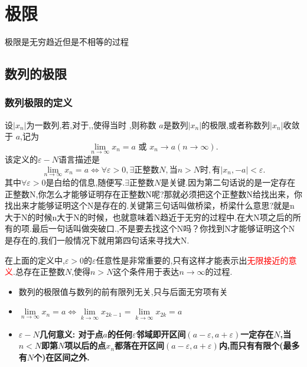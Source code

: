 \documentclass[12pt, a4paper, oneside, UTF8]{ctexbook}  %
\begin{document}
%  
\else
\fi
\chapter{极限}
极限是无穷趋近但是不相等的过程
\section{数列的极限}
\subsection{数列极限的定义}
\begin{defn}{}{}
    设$|x_n|$为一数列,若,对于,,使得当时 ,则称数 $a$是数列$| x_n |$的极限,或者称数列$| x_n |$收敛于 $a$,记为
    $$
        \lim_{n\to\infty}x_n=a\text{ 或 }x_n\to a(n\to\infty).
    $$
    该定义的$\varepsilon-N$语言描述是\\
    $$\lim_{n\to\infty}x_n=a\Leftrightarrow\forall\varepsilon>0,\exists\text{正整数}N,\text{当}n>N\text{时},\text{有}|x_n,-a|<\varepsilon.$$
    其中$\forall\varepsilon>0$是白给的信息,随便写.$\exists\text{正整数}N$是关键.因为第二句话说的是一定存在正整数N,你怎么才能够证明存在正整数N呢?那就必须把这个正整数N给找出来，你找出来才能够证明这个N是存在的.关键第三句话叫做桥梁，桥梁什么意思?就是n大于N的时候n大于N的时候，也就意味着N趋近于无穷的过程中.在大N项之后的所有的项.最后一句话叫做突破口.,不是要去找这个N吗？你找到N才能够证明这个N是存在的,我们一般情况下就用第四句话来寻找大N.
\end{defn}
在上面的定义中,$\varepsilon>0$的$\varepsilon$任意性是非常重要的,只有这样才能表示出\textcolor{red}{无限接近的意义}.总存在正整数$N$,使得$n>N$这个条件用于表达$n \to \infty$的过程.
\begin{criterion}{}{}
    \begin{itemize}
        \item 数列的极限值与数列的前有限列无关,只与后面无穷项有关
        \item $\underset{n\to\infty}{\operatorname*{\lim}}x_n=a\Leftrightarrow\underset{k\to\infty}{\operatorname*{\lim}}x_{2k-1}=\underset{k\to\infty}{\operatorname*{\lim}}x_{2k}=a$
        \item $\varepsilon - N$\textbf{几何意义: 对于点$a$的任何$\varepsilon$邻域即开区间$(a-\varepsilon,a+\varepsilon)$一定存在$N$,当$n < N$即第$N$项以后的点$x_n$都落在开区间$(a-\varepsilon,a+\varepsilon)$内,而只有有限个(最多有$N$个)在区间之外.}
    \end{itemize}
\end{criterion}
\end{document}
